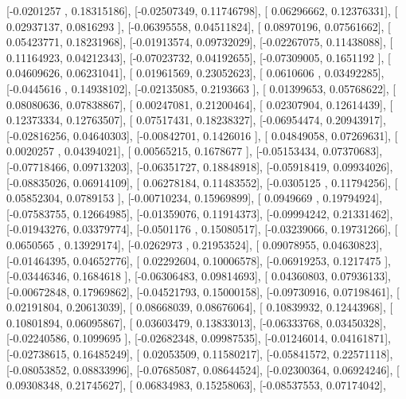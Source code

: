 \documentclass{article}
\begin{document}
       [-0.0201257 ,  0.18315186],
       [-0.02507349,  0.11746798],
       [ 0.06296662,  0.12376331],
       [ 0.02937137,  0.0816293 ],
       [-0.06395558,  0.04511824],
       [ 0.08970196,  0.07561662],
       [ 0.05423771,  0.18231968],
       [-0.01913574,  0.09732029],
       [-0.02267075,  0.11438088],
       [ 0.11164923,  0.04212343],
       [-0.07023732,  0.04192655],
       [-0.07309005,  0.1651192 ],
       [ 0.04609626,  0.06231041],
       [ 0.01961569,  0.23052623],
       [ 0.0610606 ,  0.03492285],
       [-0.0445616 ,  0.14938102],
       [-0.02135085,  0.2193663 ],
       [ 0.01399653,  0.05768622],
       [ 0.08080636,  0.07838867],
       [ 0.00247081,  0.21200464],
       [ 0.02307904,  0.12614439],
       [ 0.12373334,  0.12763507],
       [ 0.07517431,  0.18238327],
       [-0.06954474,  0.20943917],
       [-0.02816256,  0.04640303],
       [-0.00842701,  0.1426016 ],
       [ 0.04849058,  0.07269631],
       [ 0.0020257 ,  0.04394021],
       [ 0.00565215,  0.1678677 ],
       [-0.05153434,  0.07370683],
       [-0.07718466,  0.09713203],
       [-0.06351727,  0.18848918],
       [-0.05918419,  0.09934026],
       [-0.08835026,  0.06914109],
       [ 0.06278184,  0.11483552],
       [-0.0305125 ,  0.11794256],
       [ 0.05852304,  0.0789153 ],
       [-0.00710234,  0.15969899],
       [ 0.0949669 ,  0.19794924],
       [-0.07583755,  0.12664985],
       [-0.01359076,  0.11914373],
       [-0.09994242,  0.21331462],
       [-0.01943276,  0.03379774],
       [-0.0501176 ,  0.15080517],
       [-0.03239066,  0.19731266],
       [ 0.0650565 ,  0.13929174],
       [-0.0262973 ,  0.21953524],
       [ 0.09078955,  0.04630823],
       [-0.01464395,  0.04652776],
       [ 0.02292604,  0.10006578],
       [-0.06919253,  0.1217475 ],
       [-0.03446346,  0.1684618 ],
       [-0.06306483,  0.09814693],
       [ 0.04360803,  0.07936133],
       [-0.00672848,  0.17969862],
       [-0.04521793,  0.15000158],
       [-0.09730916,  0.07198461],
       [ 0.02191804,  0.20613039],
       [ 0.08668039,  0.08676064],
       [ 0.10839932,  0.12443968],
       [ 0.10801894,  0.06095867],
       [ 0.03603479,  0.13833013],
       [-0.06333768,  0.03450328],
       [-0.02240586,  0.1099695 ],
       [-0.02682348,  0.09987535],
       [-0.01246014,  0.04161871],
       [-0.02738615,  0.16485249],
       [ 0.02053509,  0.11580217],
       [-0.05841572,  0.22571118],
       [-0.08053852,  0.08833996],
       [-0.07685087,  0.08644524],
       [-0.02300364,  0.06924246],
       [ 0.09308348,  0.21745627],
       [ 0.06834983,  0.15258063],
       [-0.08537553,  0.07174042],
\end{document}
